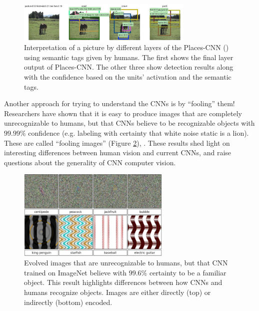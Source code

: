 \begin{figure}[H]
\begin{center}
\includegraphics[width=0.75\textwidth]{fig/cnn_objdet}
\end{center}
\caption{Interpretation of a picture by different layers of the Places-CNN () using semantic tags given by humans. The first shows the final layer output of Places-CNN. The other three show
detection results along with the confidence based on the units’ activation and the semantic tags.}
\label{fig:cnn_objdet}
\end{figure}

Another approach for trying to understand the CNNs is by ``fooling'' them! Researchers have shown that  it is easy to produce images that are
completely unrecognizable to humans, but that CNNs believe to be recognizable objects with $99.99\%$ confidence (e.g. labeling with certainty that white noise
static is a lion). These are called  “fooling images” (Figure \ref{fig:cnn_fool}), \cite{NguyenYC14}. These results shed light on interesting differences
between human vision and current CNNs, and raise questions about the generality of CNN computer vision.

\begin{figure}[H]
\begin{center}
\includegraphics[width=0.65\textwidth]{fig/cnn_fool}
\end{center}
\caption{Evolved images that are unrecognizable to humans, but that CNN trained on ImageNet believe with
$99.6\%$ certainty to be a familiar object. This result highlights differences between how CNNs and humans recognize objects.
Images are either directly (top) or indirectly (bottom) encoded.}
\label{fig:cnn_fool}
\end{figure}

